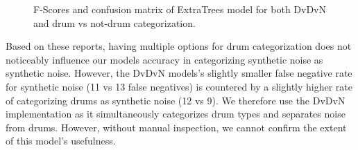 \documentclass[runningheads,a4paper]{llncs}
\begin{document}
\begin{appendices}
\begin{figure}[htbp!]
\begin{center}
\end{center}


\caption{F-Scores and confusion matrix of ExtraTrees model for both DvDvN and drum vs not-drum categorization.}
\label{fig:conf_f1_dvn}
\end{figure}

Based on these reports, having multiple options for drum categorization does not noticeably influence our models accuracy in categorizing synthetic noise as synthetic noise. However, the DvDvN models's slightly smaller false negative rate for synthetic noise (11 vs 13 false negatives) is countered by a slightly higher rate of categorizing drums as synthetic noise (12 vs 9).  We therefore use the DvDvN implementation as it simultaneously categorizes drum types and separates noise from drums. However, without manual inspection, we cannot confirm the extent of this model's usefulness. 

\end{appendices}
\end{document}
